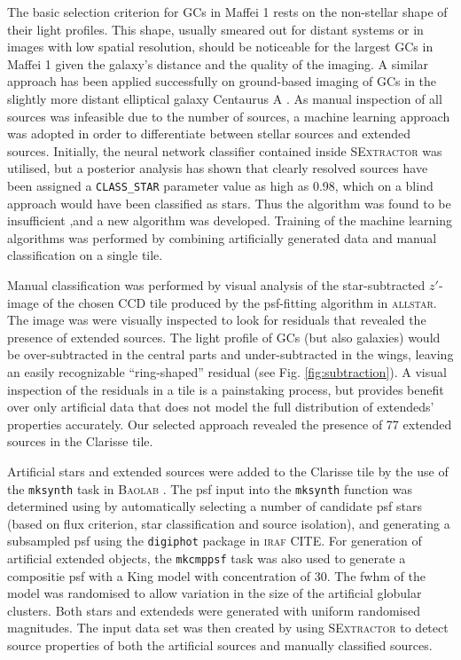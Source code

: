 \documentclass[useAMS,usenatbib]{mn2e}
\begin{document}
The basic selection criterion for GCs in Maffei 1 rests on the
non-stellar shape of their light profiles. This shape, usually smeared
out for distant systems or in images with low spatial resolution,
should be noticeable for the largest GCs in Maffei 1 given the
galaxy's distance and the quality of the imaging. A similar approach
has been applied successfully on ground-based imaging of GCs in the
slightly more distant elliptical galaxy Centaurus A
\citep{rejkuba01,gomez06,gomez07}. As manual inspection of all sources was infeasible
due to the number of sources, a machine learning approach was adopted in order
to differentiate between stellar sources and extended sources. Initially, the neural network
classifier contained inside \textsc{SExtractor} was utilised, but a posterior analysis has shown that clearly resolved sources have been assigned a \verb+CLASS_STAR+ parameter value as high
as 0.98, which on a blind approach would have been classified as
stars. Thus the algorithm was found to be insufficient ,and a new algorithm was developed. Training of the machine learning algorithms was performed by combining artificially generated data and manual classification on a single tile.

Manual classification was performed by visual analysis of the star-subtracted $z'$-image of the chosen CCD tile produced by the psf-fitting algorithm in
\textsc{allstar}. The image was were visually inspected to look for residuals that
revealed the presence of extended sources. The light profile of GCs
(but also galaxies) would be over-subtracted in the central parts and
under-subtracted in the wings, leaving an easily recognizable
``ring-shaped'' residual (see Fig. \ref{fig:subtraction}). A visual
inspection of the residuals in a tile is a
painstaking process, but provides benefit over only artificial data that does not model the full distribution of extendeds' properties accurately. Our selected approach revealed the presence of 77 extended sources in the Clarisse tile.

Artificial stars and extended sources were added to the Clarisse tile by the use of the \verb|mksynth| task in \textsc{Baolab} \citep{Larsen1999}. The psf input into the \verb|mksynth| function was determined using by automatically selecting a number of candidate psf stars (based on flux criterion, star classification and source isolation), and generating a subsampled psf using the \verb|digiphot| package in \textsc{iraf} {\color{red} CITE}. For generation of artificial extended objects, the \verb|mkcmppsf| task was also used to generate a compositie psf with a King model \citep{King1962} with concentration of 30. The fwhm of the model was randomised to allow variation in the size of the artificial globular clusters. Both stars and extendeds were generated with uniform randomised magnitudes. The input data set was then created by using \textsc{SExtractor} to detect source properties of both the artificial sources and manually classified sources.
\end{document}
